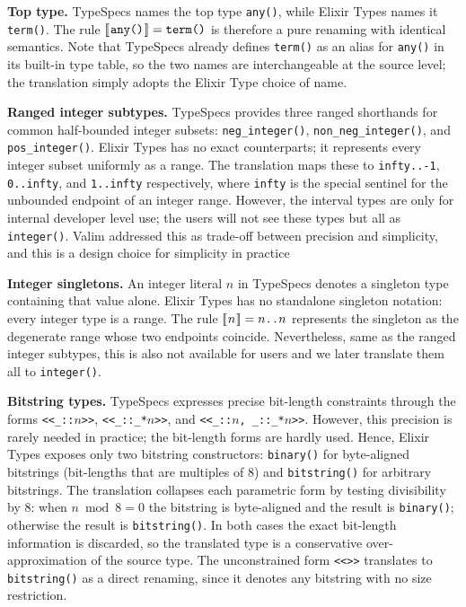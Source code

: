\textbf{Top type.}
TypeSpecs names the top type \texttt{any()}, while Elixir Types names it \texttt{term()}.
The rule $[\![\hspace{.07em}\texttt{any()}\hspace{.07em}]\!] = \texttt{term()}$ is therefore a pure renaming with identical semantics.
Note that TypeSpecs already defines \texttt{term()} as an alias for \texttt{any()} in its built-in type table, so the two names are interchangeable at the source level; the translation simply adopts the Elixir Type choice of name.

\textbf{Ranged integer subtypes.}
TypeSpecs provides three ranged shorthands for common half-bounded integer subsets: \texttt{neg\_integer()}, \texttt{non\_neg\_integer()}, and \texttt{pos\_integer()}.
Elixir Types has no exact counterparts; it represents every integer subset uniformly as a range.
The translation maps these to \texttt{infty..-1}, \texttt{0..infty}, and \texttt{1..infty} respectively, where \texttt{infty} is the special sentinel for the unbounded endpoint of an integer range.
However, the interval types are only for internal developer level use; the users will not see these types but all as \texttt{integer()}.
Valim addressed this as trade-off between precision and simplicity, and this is a design choice for simplicity in practice~\cite{elixir-type-precision}

\textbf{Integer singletons.}
An integer literal $n$ in TypeSpecs denotes a singleton type containing that value alone.
Elixir Types has no standalone singleton notation: every integer type is a range.
The rule $[\![\hspace{.07em}n\hspace{.07em}]\!] = n\texttt{..}n$ represents the singleton as the degenerate range whose two endpoints coincide.
Nevertheless, same as the ranged integer subtypes, this is also not available for users and we later translate them all to \texttt{integer()}.

\textbf{Bitstring types.}
TypeSpecs expresses precise bit-length constraints through the forms \texttt{<<\_::$n$>>}, \texttt{<<\_::\_*$n$>>}, and \texttt{<<\_::$n$, \_::\_*$n$>>}.
However, this precision is rarely needed in practice; the bit-length forms are hardly used.
Hence, Elixir Types exposes only two bitstring constructors: \texttt{binary()} for byte-aligned bitstrings (bit-lengths that are multiples of 8) and \texttt{bitstring()} for arbitrary bitstrings.
The translation collapses each parametric form by testing divisibility by 8: when $n \bmod 8 = 0$ the bitstring is byte-aligned and the result is \texttt{binary()}; otherwise the result is \texttt{bitstring()}.
In both cases the exact bit-length information is discarded, so the translated type is a conservative over-approximation of the source type.
The unconstrained form \texttt{<<>>} translates to \texttt{bitstring()} as a direct renaming, since it denotes any bitstring with no size restriction.


